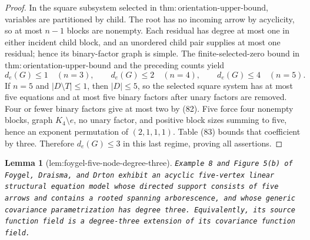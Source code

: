 \documentclass{article}
\newtheorem{lemma}{Lemma}
\begin{document}
\begin{proof}
In the square subsystem selected in \(\mathrm{thm:orientation\mbox{-}upper\mbox{-}bound}\), variables are partitioned by child.  The root has no incoming arrow by acyclicity, so at most \(n-1\) blocks are nonempty.  Each residual has degree at most one in either incident child block, and an unordered child pair supplies at most one residual; hence its binary-factor graph is simple.  The finite-selected-zero bound in \(\mathrm{thm:orientation\mbox{-}upper\mbox{-}bound}\) and the preceding counts yield
\[
 d_e(G)\le1\quad(n=3),\qquad
 d_e(G)\le2\quad(n=4),\qquad
 d_e(G)\le4\quad(n=5).
\tag{86}
\]
If \(n=5\) and \(|D\setminus T|\le1\), then \(|D|\le5\), so the selected square system has at most five equations and at most five binary factors after unary factors are removed.  Four or fewer binary factors give at most two by (82).  Five force four nonempty blocks, graph \(K_4\setminus e\), no unary factor, and positive block sizes summing to five, hence an exponent permutation of \((2,1,1,1)\).  Table (83) bounds that coefficient by three.  Therefore \(d_e(G)\le3\) in this last regime, proving all assertions.
\end{proof}

\begin{lemma}[lem:foygel-five-node-degree-three]\label{lem:foygel-five-node-degree-three}
\texttt{Example 8 and Figure 5(b) of Foygel,\allowbreak{} Draisma,\allowbreak{} and Drton exhibit an acyclic five-\allowbreak{}vertex linear structural equation model whose directed support consists of five arrows and contains a rooted spanning arborescence,\allowbreak{} and whose generic covariance parametrization has degree three. Equivalently,\allowbreak{} its source function field is a degree-\allowbreak{}three extension of its covariance function field.}
\end{lemma}
\end{document}
